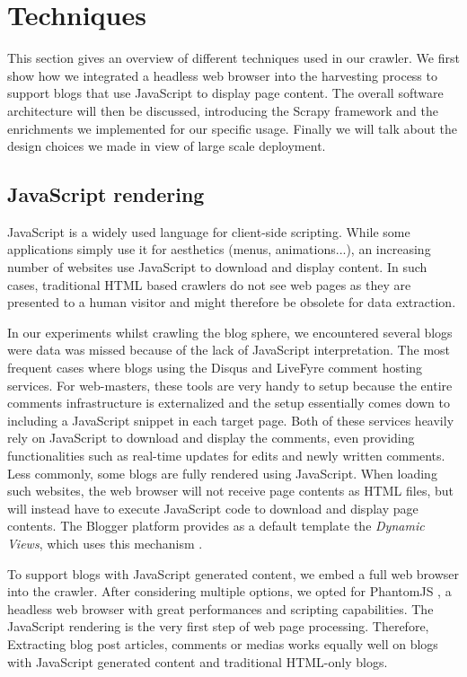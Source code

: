 \section{Techniques}

This section gives an overview of different techniques used in our crawler. We first show how we integrated a headless web browser into the harvesting process to support blogs that use JavaScript to display page content. The overall software architecture will then be discussed, introducing the Scrapy framework and the enrichments we implemented for our specific usage. Finally we will talk about the design choices we made in view of large scale deployment.


\subsection{JavaScript rendering}
JavaScript is a widely used language for client-side scripting. While some applications simply use it for aesthetics (menus, animations...), an increasing number of websites use JavaScript to download and display content. In such cases, traditional HTML based crawlers do not see web pages as they are presented to a human visitor and might therefore be obsolete for data extraction.

In our experiments whilst crawling the blog sphere, we encountered several blogs were data was missed because of the lack of JavaScript interpretation. The most frequent cases where blogs using the Disqus \cite{disqus2013} and LiveFyre \cite{livefyre2013} comment hosting services. For web-masters, these tools are very handy to setup because the entire comments infrastructure is externalized and the setup essentially comes down to including a JavaScript snippet in each target page. Both of these services heavily rely on JavaScript to download and display the comments, even providing functionalities such as real-time updates for edits and newly written comments. Less commonly, some blogs are fully rendered using JavaScript. When loading such websites, the web browser will not receive page contents as HTML files, but will instead have to execute JavaScript code to download and display page contents. The Blogger platform provides as a default template the \emph{Dynamic Views}, which uses this mechanism \cite{antinharasymiv2011}.

To support blogs with JavaScript generated content, we embed a full web browser into the crawler. After considering multiple options, we opted for PhantomJS \cite{phantomjs2013}, a headless web browser with great performances and scripting capabilities. The JavaScript rendering is the very first step of web page processing. Therefore, Extracting blog post articles, comments or medias works equally well on blogs with JavaScript generated content and traditional HTML-only blogs.

